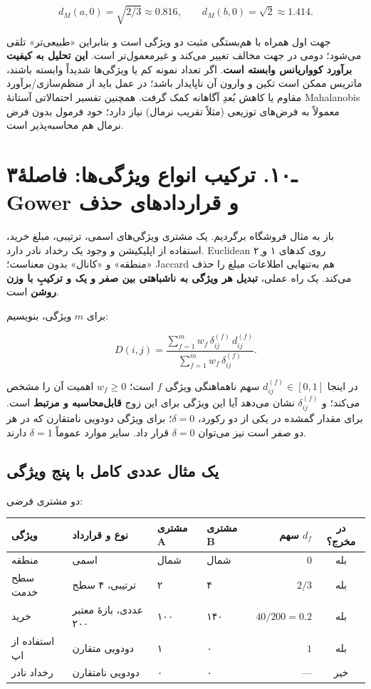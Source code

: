 \documentclass[12pt,a4paper,oneside]{book}
\begin{document}
\[
d_M(a,0)=\sqrt{2/3}\approx0.816,\qquad d_M(b,0)=\sqrt2\approx1.414.
\]

جهت اول همراه با هم‌بستگی مثبت دو ویژگی است و بنابراین «طبیعی‌تر» تلقی می‌شود؛ دومی در جهت مخالف تغییر می‌کند و غیرمعمول‌تر است. \textbf{این تحلیل به کیفیت برآورد کوواریانس وابسته است}. اگر تعداد نمونه کم یا ویژگی‌ها شدیداً وابسته باشند، ماتریس ممکن است تکین و وارون آن ناپایدار باشد؛ در عمل باید از منظم‌سازی/برآورد مقاوم یا کاهش بُعدِ آگاهانه کمک گرفت. همچنین تفسیر احتمالاتی آستانهٔ Mahalanobis معمولاً به فرض‌های توزیعی (مثلاً تقریب نرمال) نیاز دارد؛ خود فرمول بدون فرض نرمال هم محاسبه‌پذیر است.

\section{۳ـ۱۰. ترکیب انواع ویژگی‌ها: فاصلهٔ Gower و قراردادهای حذف}\label{ux640ux6f1ux6f0.-ux62aux631ux6a9ux6ccux628-ux627ux646ux648ux627ux639-ux648ux6ccux698ux6afux6ccux647ux627-ux641ux627ux635ux644ux647-gower-ux648-ux642ux631ux627ux631ux62fux627ux62fux647ux627ux6cc-ux62dux630ux641}

باز به مثال فروشگاه برگردیم. یک مشتری ویژگی‌های اسمی، ترتیبی، مبلغ خرید، استفاده از اپلیکیشن و وجود یک رخداد نادر دارد. Euclidean روی کدهای ۱ و ۲ِ «منطقه» و «کانال» بدون معناست؛ Jaccard هم به‌تنهایی اطلاعات مبلغ را حذف می‌کند. یک راه عملی، \textbf{تبدیل هر ویژگی به ناشباهتی بین صفر و یک و ترکیبِ با وزن روشن} است.

برای \(m\) ویژگی، بنویسیم:

\[
D(i,j)=\frac{\sum_{f=1}^{m}w_f\,\delta_{ij}^{(f)}\,d_{ij}^{(f)}}{\sum_{f=1}^{m}w_f\,\delta_{ij}^{(f)}}.
\]

در اینجا \(d_{ij}^{(f)}\in[0,1]\) سهم ناهماهنگی ویژگی \(f\) است؛ \(w_f\ge0\) اهمیت آن را مشخص می‌کند؛ و \(\delta_{ij}^{(f)}\) نشان می‌دهد آیا این ویژگی برای این زوج \textbf{قابل‌محاسبه و مرتبط} است. برای مقدار گمشده در یکی از دو رکورد، \(\delta=0\)؛ برای ویژگی دودویی نامتقارن که در هر دو صفر است نیز می‌توان \(\delta=0\) قرار داد. سایر موارد عموماً \(\delta=1\) دارند.

\subsection{یک مثال عددی کامل با پنج ویژگی}\label{ux6ccux6a9-ux645ux62bux627ux644-ux639ux62fux62fux6cc-ux6a9ux627ux645ux644-ux628ux627-ux67eux646ux62c-ux648ux6ccux698ux6afux6cc}

دو مشتری فرضی:

\begin{longtable}[]{@{}llllrc@{}}
\toprule\noalign{}
ویژگی & نوع و قرارداد & مشتری A & مشتری B & سهم \(d_f\) & در مخرج؟ \\
\midrule\noalign{}
\endhead
\bottomrule\noalign{}
\endlastfoot
منطقه & اسمی & شمال & شمال & \(0\) & بله \\
سطح خدمت & ترتیبی، ۴ سطح & ۲ & ۴ & \(2/3\) & بله \\
خرید & عددی، بازهٔ معتبر ۲۰۰ & ۱۰۰ & ۱۴۰ & \(40/200=0.2\) & بله \\
استفاده از اپ & دودویی متقارن & ۱ & ۰ & \(1\) & بله \\
رخداد نادر & دودویی نامتقارن & ۰ & ۰ & --- & خیر \\
\end{longtable}
\end{document}
